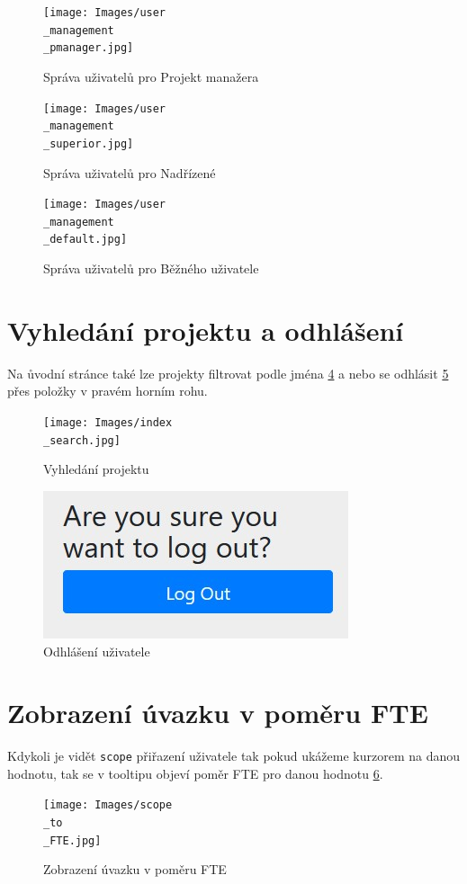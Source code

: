 \documentclass[czech,P5]{thesiskiv}
\begin{document}
 \begin{figure}[H]
	\centering
	\texttt{[image: Images/user\\\_management\\\_pmanager.jpg]}
	\caption{Správa uživatelů pro Projekt manažera}
	\label{fig:userManPMan} 
\end{figure}
 \begin{figure}[H]
	\centering
	\texttt{[image: Images/user\\\_management\\\_superior.jpg]}
	\caption{Správa uživatelů pro Nadřízené}
	\label{fig:userManSup} 
\end{figure}
 \begin{figure}[H]
	\centering
	\texttt{[image: Images/user\\\_management\\\_default.jpg]}
	\caption{Správa uživatelů pro Běžného uživatele}
	\label{fig:userManDef} 
\end{figure}
\newpage

\section{Vyhledání projektu a odhlášení}
Na ůvodní stránce také lze projekty filtrovat podle jména \ref{fig:searchProject}  a nebo se odhlásit \ref{fig:logout} přes položky v pravém horním rohu.
 \begin{figure}[H]
	\centering
	\texttt{[image: Images/index\\\_search.jpg]}
	\caption{Vyhledání projektu}
	\label{fig:searchProject} 
\end{figure}
 \begin{figure}[H]
	\centering
	\includegraphics{Images/logout.jpg}
	\caption{Odhlášení uživatele}
	\label{fig:logout} 
\end{figure}

\section{Zobrazení úvazku v poměru FTE}
Kdykoli je vidět \texttt{scope} přiřazení uživatele tak pokud ukážeme kurzorem na danou hodnotu, tak se v tooltipu objeví poměr FTE pro danou hodnotu \ref{fig:FTE}.
 \begin{figure}[H]
	\centering
	\texttt{[image: Images/scope\\\_to\\\_FTE.jpg]}
	\caption{Zobrazení úvazku v poměru FTE}
	\label{fig:FTE} 
\end{figure}
\end{document}
